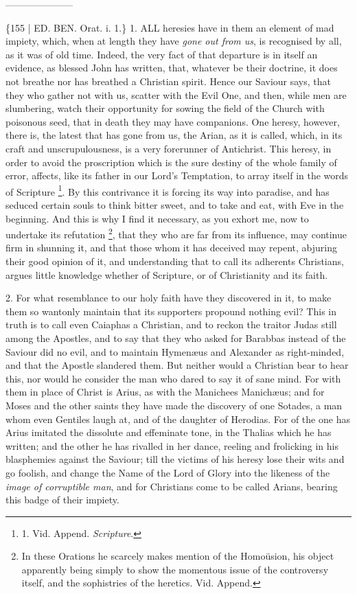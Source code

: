 ———————



\{155 | ED.
BEN.
Orat. i. 1.\} 1. ALL heresies have in them an
element of mad impiety, which, when at length they have \emph{gone out
from us}, is recognised by all, as it was of old time. Indeed, the
very fact of that departure is in itself an evidence, as blessed John
has written, that, whatever be their doctrine, it does not breathe nor
has breathed a Christian spirit. Hence our Saviour says, that they who
gather not with us, scatter with the Evil One, and then, while men are
slumbering, watch their opportunity for sowing the field of the Church
with poisonous seed, that in death they may have companions. One
heresy, however, there is, the latest that has gone from us, the
Arian, as it is called, which, in its craft and unscrupulousness, is a
very forerunner of Antichrist. This heresy, in order to avoid the
proscription which is the sure destiny of the whole family of error,
affects, like its father in our Lord's Temptation, to array itself in
the words of Scripture \footnote{

1. Vid. Append. \emph{Scripture}.}.
By this contrivance it is forcing its way into paradise, and has
seduced certain souls to think bitter sweet, and to take and eat, with
Eve in the beginning. And this is why I find it necessary, as you
exhort me, now to undertake its refutation \footnote{In these Orations he scarcely makes mention of the Homoüsion, his
object apparently being simply to show the momentous issue of the
controversy itself, and the sophistries of the heretics. Vid. Append.}, that they who are far from its influence, may continue firm in
shunning it, and that those whom it has deceived may repent, abjuring
their good opinion of it, and understanding that to call its adherents
Christians, argues little knowledge whether of Scripture, or of
Christianity and its faith.

2. For what resemblance to our
holy faith have they discovered in it, to make them so wantonly
maintain that its supporters propound nothing evil? This in truth is
to call even Caiaphas a Christian, and to reckon the traitor Judas
still among the Apostles, and to say that they who asked for Barabbas
instead of the Saviour did no evil, and to maintain Hymenæus and
Alexander as right-minded, and that the Apostle slandered them. But
neither would a Christian bear to hear this, nor would he consider the
man who dared to say it of sane mind. For with them in place of Christ
is Arius, as with the Manichees Manichæus; and for Moses and the
other saints they have made the discovery of one Sotades, a man whom
even Gentiles laugh at, and of the daughter of Herodias. For of the
one has Arius imitated the dissolute and effeminate tone, in the
Thalias which he has written; and the other he has rivalled in her
dance, reeling and frolicking in his blasphemies against the Saviour;
till the victims of his heresy lose their wits and go foolish, and
change the Name of the Lord of Glory into the likeness of the \emph{image
of corruptible man}, and for Christians come to be called Arians,
bearing this badge of their impiety.

